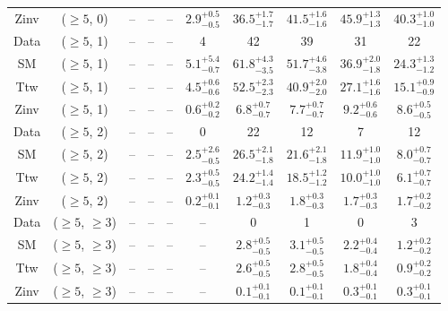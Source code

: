 \begin{table}[h!]
{\begin{tabular}{cccccccccc}
	Zinv & ($\ge5$, 0) & -- & -- & -- & $2.9^{+ 0.5 }_{- 0.5 }$ & $36.5^{+ 1.7 }_{- 1.7 }$ & $41.5^{+ 1.6 }_{- 1.6 }$ & $45.9^{+ 1.3 }_{- 1.3 }$ & $40.3^{+ 1.0 }_{- 1.0 }$ \\[0.5ex] 
	Data & ($\ge5$, 1) & -- & -- & -- & 4 & 42 & 39 & 31 & 22 \\[0.5ex] 
	SM & ($\ge5$, 1) & -- & -- & -- & $5.1^{+ 5.4 }_{- 0.7 }$ & $61.8^{+ 4.3 }_{- 3.5 }$ & $51.7^{+ 4.6 }_{- 3.8 }$ & $36.9^{+ 2.0 }_{- 1.8 }$ & $24.3^{+ 1.3 }_{- 1.2 }$ \\[0.5ex] 
	Ttw & ($\ge5$, 1) & -- & -- & -- & $4.5^{+ 0.6 }_{- 0.6 }$ & $52.5^{+ 2.3 }_{- 2.3 }$ & $40.9^{+ 2.0 }_{- 2.0 }$ & $27.1^{+ 1.6 }_{- 1.6 }$ & $15.1^{+ 0.9 }_{- 0.9 }$ \\[0.5ex] 
	Zinv & ($\ge5$, 1) & -- & -- & -- & $0.6^{+ 0.2 }_{- 0.2 }$ & $6.8^{+ 0.7 }_{- 0.7 }$ & $7.7^{+ 0.7 }_{- 0.7 }$ & $9.2^{+ 0.6 }_{- 0.6 }$ & $8.6^{+ 0.5 }_{- 0.5 }$ \\[0.5ex] 
	Data & ($\ge5$, 2) & -- & -- & -- & 0 & 22 & 12 & 7 & 12 \\[0.5ex] 
	SM & ($\ge5$, 2) & -- & -- & -- & $2.5^{+ 2.6 }_{- 0.5 }$ & $26.5^{+ 2.1 }_{- 1.8 }$ & $21.6^{+ 2.1 }_{- 1.8 }$ & $11.9^{+ 1.0 }_{- 1.0 }$ & $8.0^{+ 0.7 }_{- 0.7 }$ \\[0.5ex] 
	Ttw & ($\ge5$, 2) & -- & -- & -- & $2.3^{+ 0.5 }_{- 0.5 }$ & $24.2^{+ 1.4 }_{- 1.4 }$ & $18.5^{+ 1.2 }_{- 1.2 }$ & $10.0^{+ 1.0 }_{- 1.0 }$ & $6.1^{+ 0.7 }_{- 0.7 }$ \\[0.5ex] 
	Zinv & ($\ge5$, 2) & -- & -- & -- & $0.2^{+ 0.1 }_{- 0.1 }$ & $1.2^{+ 0.3 }_{- 0.3 }$ & $1.8^{+ 0.3 }_{- 0.3 }$ & $1.7^{+ 0.3 }_{- 0.3 }$ & $1.7^{+ 0.2 }_{- 0.2 }$ \\[0.5ex] 
	Data & ($\ge5$, $\ge3$) & -- & -- & -- & -- & 0 & 1 & 0 & 3 \\[0.5ex] 
	SM & ($\ge5$, $\ge3$) & -- & -- & -- & -- & $2.8^{+ 0.5 }_{- 0.5 }$ & $3.1^{+ 0.5 }_{- 0.5 }$ & $2.2^{+ 0.4 }_{- 0.4 }$ & $1.2^{+ 0.2 }_{- 0.2 }$ \\[0.5ex] 
	Ttw & ($\ge5$, $\ge3$) & -- & -- & -- & -- & $2.6^{+ 0.5 }_{- 0.5 }$ & $2.8^{+ 0.5 }_{- 0.5 }$ & $1.8^{+ 0.4 }_{- 0.4 }$ & $0.9^{+ 0.2 }_{- 0.2 }$ \\[0.5ex] 
	Zinv & ($\ge5$, $\ge3$) & -- & -- & -- & -- & $0.1^{+ 0.1 }_{- 0.1 }$ & $0.1^{+ 0.1 }_{- 0.1 }$ & $0.3^{+ 0.1 }_{- 0.1 }$ & $0.3^{+ 0.1 }_{- 0.1 }$ \\[0.5ex] 
	\hline
	\hline
\end{tabular}}
\end{table}
